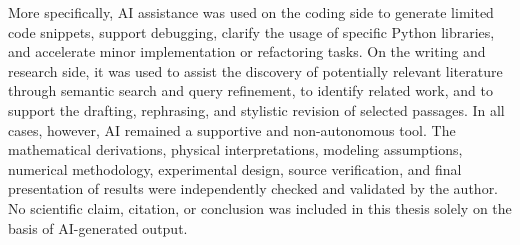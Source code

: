 More specifically, AI assistance was used on the coding side to generate limited code snippets, support debugging, clarify the usage of specific Python libraries, and accelerate minor implementation or refactoring tasks. On the writing and research side, it was used to assist the discovery of potentially relevant literature through semantic search and query refinement, to identify related work, and to support the drafting, rephrasing, and stylistic revision of selected passages. In all cases, however, AI remained a supportive and non-autonomous tool. The mathematical derivations, physical interpretations, modeling assumptions, numerical methodology, experimental design, source verification, and final presentation of results were independently checked and validated by the author. No scientific claim, citation, or conclusion was included in this thesis solely on the basis of AI-generated output.